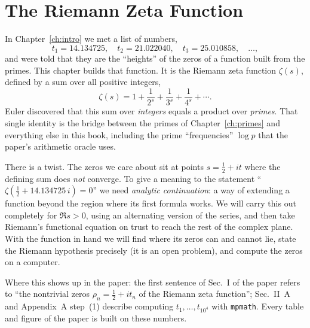 \chapter{The Riemann Zeta Function}\label{ch:zeta}

\begin{chapterintro}
In Chapter~\ref{ch:intro} we met a list of numbers,
\[
t_1 = 14.134725,\quad t_2 = 21.022040,\quad t_3 = 25.010858,\quad \dots,
\]
and were told that they are the ``heights'' of the zeros of a function built from the primes. This chapter builds that function. It is the Riemann zeta function $\zeta(s)$, defined by a sum over all positive integers,
\[
\zeta(s) = 1 + \frac{1}{2^s} + \frac{1}{3^s} + \frac{1}{4^s} + \cdots .
\]
Euler discovered that this sum over \emph{integers} equals a product over \emph{primes}. That single identity is the bridge between the primes of Chapter~\ref{ch:primes} and everything else in this book, including the prime ``frequencies'' $\log p$ that the paper's arithmetic oracle uses.

There is a twist. The zeros we care about sit at points $s=\tfrac12+it$ where the defining sum does \emph{not} converge. To give a meaning to the statement ``$\zeta(\tfrac12+14.134725\,i)=0$'' we need \emph{analytic continuation}: a way of extending a function beyond the region where its first formula works. We will carry this out completely for $\Re s>0$, using an alternating version of the series, and then take Riemann's functional equation on trust to reach the rest of the complex plane. With the function in hand we will find where its zeros can and cannot lie, state the Riemann hypothesis precisely (it is an open problem), and compute the zeros on a computer.

Where this shows up in the paper: the first sentence of Sec.~I of the paper \cite{soniR1} refers to ``the nontrivial zeros $\rho_n=\tfrac12+it_n$ of the Riemann zeta function''; Sec.~II~A and Appendix~A step~(1) describe computing $t_1,\dots,t_{10^4}$ with \texttt{mpmath}. Every table and figure of the paper is built on these numbers.
\end{chapterintro}

